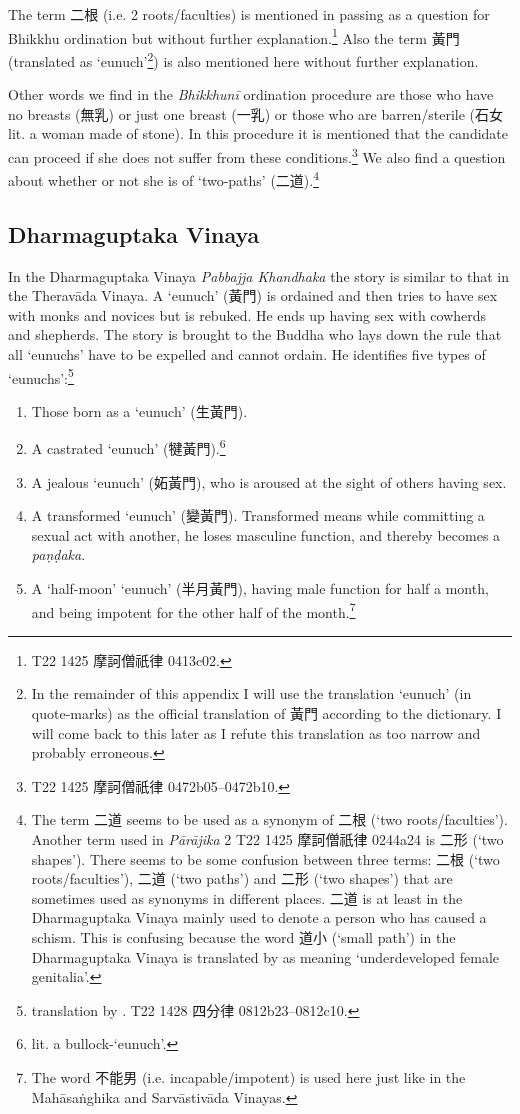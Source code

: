 The term 二根 (i.e. 2 roots/faculties) is mentioned in passing as a question for Bhikkhu ordination but without further explanation.\footnote{T22 1425 摩訶僧祇律 0413c02.} Also the term 黃門 (translated as `eunuch'\footnote{In the remainder of this appendix I will use the translation `eunuch' (in quote-marks) as the official translation of 黃門 according to the dictionary. I will come back to this later as I refute this translation as too narrow and probably erroneous.}) is also mentioned here without further explanation.

Other words we find in the {\em Bhikkhunī} ordination procedure are those who have no breasts (無乳) or just one breast (一乳) or those who are barren/sterile (石女 lit. a woman made of stone). In this procedure it is mentioned that the candidate can proceed if she does not suffer from these conditions.\footnote{T22 1425 摩訶僧祇律 0472b05–0472b10.} We also find a question about whether or not she is of `two-paths’ (二道).\footnote{The term 二道 seems to be used as a synonym of 二根 (`two roots/faculties'). Another term used in {\em Pārājika} 2 T22 1425 摩訶僧祇律 0244a24 is 二形 (`two shapes'). There seems to be some confusion between three terms: 二根 (`two roots/faculties'), 二道 (`two paths') and 二形 (`two shapes') that are sometimes used as synonyms in different places. 二道 is at least in the Dharmaguptaka Vinaya mainly used to denote a person who has caused a schism. This is confusing because the word 道小 (`small path') in the Dharmaguptaka Vinaya is translated by \cite{bodhi} as meaning `underdeveloped female genitalia'.}

\subsection{Dharmaguptaka Vinaya}
In the Dharmaguptaka Vinaya {\em Pabbajja Khandhaka} the story is similar to that in the Theravāda Vinaya. A `eunuch' (黃門) is ordained and then tries to have sex with monks and novices but is rebuked. He ends up having sex with cowherds and shepherds. The story is brought to the Buddha who lays down the rule that all `eunuchs' have to be expelled and cannot ordain. He identifies five types of `eunuchs':\footnote{translation by \cite{bodhi}. T22 1428 四分律 0812b23–0812c10.} 

\begin{enumerate}
\item Those born as a `eunuch' (生黃門). 
\item A castrated `eunuch' (犍黃門).\footnote{lit. a bullock-`eunuch'.}
\item A jealous `eunuch' (妬黃門), who is aroused at the sight of others having sex.
\item A transformed `eunuch' (變黃門). Transformed means while committing a sexual act with another, he loses masculine function, and thereby becomes a {\em paṇḍaka}.
\item A `half-moon' `eunuch' (半月黃門), having male function for half a month, and being impotent for the other half of the month.\footnote{The word 不能男 (i.e. incapable/impotent) is used here just like in the Mahāsaṅghika and Sarvāstivāda Vinayas.}
\end{enumerate}

